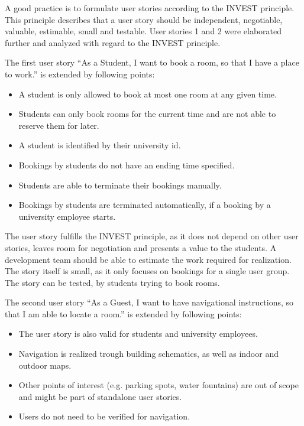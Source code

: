 \documentclass[conference,onecolumn]{IEEEtran}
\begin{document}
A good practice is to formulate user stories according to the INVEST principle.
This principle describes that a user story should be independent, negotiable, valuable, estimable, small and testable.
User stories 1 and 2 were elaborated further and analyzed with regard to the INVEST principle.

The first user story ``As a Student, I want to book a room, so that I have a place to work.'' is extended by following points:

\begin{itemize}
	\item A student is only allowed to book at most one room at any given time.
	\item Students can only book rooms for the current time and are not able to reserve them for later.
	\item A student is identified by their university id.
	\item Bookings by students do not have an ending time specified.
	\item Students are able to terminate their bookings manually.
	\item Bookings by students are terminated automatically, if a booking by a university employee starts.
\end{itemize}

The user story fulfills the INVEST principle, as it does not depend on other user stories, leaves room for negotiation and presents a value to the students.
A development team should be able to estimate the work required for realization. The story itself is small, as it only focuses on bookings for a single user group.
The story can be tested, by students trying to book rooms.

The second user story ``As a Guest, I want to have navigational instructions, so that I am able to locate a room.'' is extended by following points:

\begin{itemize}
	\item The user story is also valid for students and university employees.
	\item Navigation is realized trough  building schematics, as well as indoor and outdoor maps.
	\item Other points of interest (e.g. parking spots, water fountains) are out of scope and might be part of standalone user stories.
	\item Users do not need to be verified for navigation.
\end{itemize}
\end{document}
